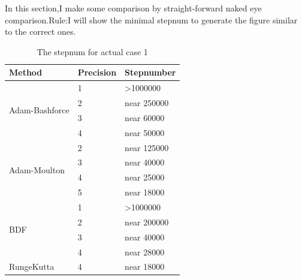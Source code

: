\documentclass[UTF8]{ctexart}
\theoremstyle{plain}
\theoremstyle{definition}
\theoremstyle{remark}
\begin{document}
In this section,I make some comparison by straight-forward naked eye comparison.Rule:I will show the minimal stepnum to generate the figure similar to the correct ones.
\begin{table}[H]
\centering
\begin{tabular}{|l|l|l|}
\hline
Method                          & Precision & Stepnumber            \\ \hline
\multirow{4}{*}{Adam-Bashforce} & 1         & \textgreater{}1000000 \\ \cline{2-3} 
                                & 2         & near 250000           \\ \cline{2-3} 
                                & 3         & near 60000            \\ \cline{2-3} 
                                & 4         & near 50000            \\ \hline
\multirow{4}{*}{Adam-Moulton}   & 2         & near 125000           \\ \cline{2-3} 
                                & 3         & near 40000            \\ \cline{2-3} 
                                & 4         & near 25000            \\ \cline{2-3} 
                                & 5         & near 18000            \\ \hline
\multirow{4}{*}{BDF}            & 1         & \textgreater{}1000000 \\ \cline{2-3} 
                                & 2         & near 200000           \\ \cline{2-3} 
                                & 3         & near 40000            \\ \cline{2-3} 
                                & 4         & near 28000            \\ \hline
RungeKutta                      & 4         & near 18000            \\ \hline
\end{tabular}
\caption{The stepnum for actual case 1}
\end{table}
\end{document}
